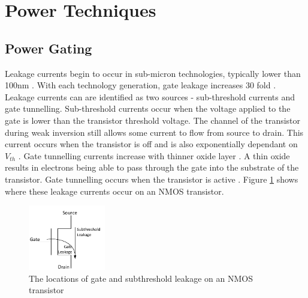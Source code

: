 
\section{Power Techniques}
\subsection{Power Gating}



Leakage currents begin to occur in sub-micron technologies, typically lower than 100nm \cite{bsoul2010fpga, nair2009comparative}.
With each technology generation, gate leakage increases 30 fold \cite{bernstein2003design}.
Leakage currents can are identified as two sources - sub-threshold currents and gate tunnelling. 
Sub-threshold currents occur when the voltage applied to the gate is lower than the transistor threshold voltage. 
The channel of the transistor during weak inversion still allows some current to flow from source to drain.
This current occurs when the transistor is off and is also exponentially dependant on $V_{th}$ \cite{borkar1999design}.
Gate tunnelling currents increase with thinner oxide layer \cite{m2002international}. 
A thin oxide results in electrons being able to pass through the gate into the substrate of the transistor. 
Gate tunnelling occurs when the transistor is active \cite{nair2009comparative}.
Figure \ref{fig:leakage} shows where these leakage currents occur on an NMOS transistor.

\begin{figure}
\centering
\includegraphics[width=0.3\textwidth]{Figures/leakage.pdf}
\caption{The locations of gate and subthreshold leakage on an NMOS transistor}
\label{fig:leakage}
\end{figure}



